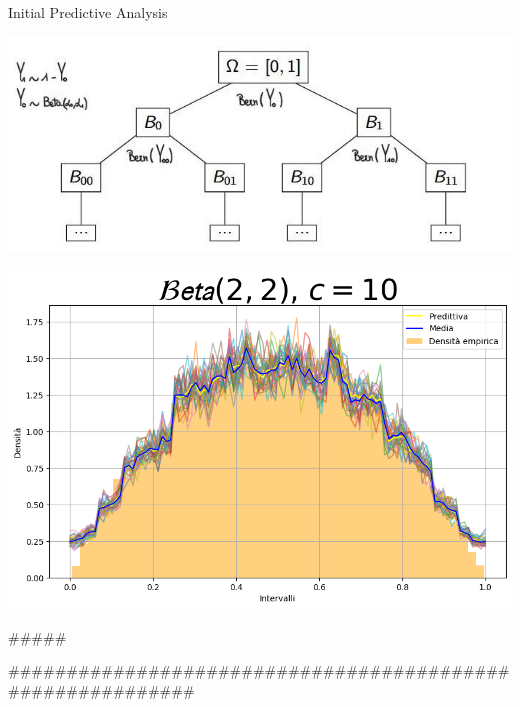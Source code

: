 \documentclass{beamer}
\begin{document}
\begin{frame}{Initial Predictive Analysis}
\centering
    \begin{minipage}{0.7\textwidth}
        \centering
        \includegraphics[width=\textwidth]{albero.jpg}
        \smallskip %
    \end{minipage}

    \begin{minipage}{0.65\textwidth}
        \centering
        \includegraphics[width=\textwidth]{Gaus1.png}
    \end{minipage}
\end{frame}#####

###########################################################
\end{document}

